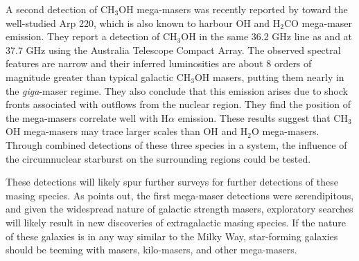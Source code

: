 A second detection of CH$_3$OH mega-masers was recently reported by \citet{chen_methanol_2015} toward the well-studied Arp 220, which is also known to harbour OH and H$_2$CO mega-maser emission. They report a detection of CH$_3$OH in the same 36.2 GHz line as \citet{wang2014_SiO_CH3OH} and at 37.7 GHz using the Australia Telescope Compact Array. The observed spectral features are narrow and their inferred luminosities are about 8 orders of magnitude greater than typical galactic CH$_3$OH masers, putting them nearly in the {\it giga}-maser regime. They also conclude that this emission arises due to shock fronts associated with outflows from the nuclear region. They find the position of the mega-masers correlate well with H$\alpha$ emission. These results suggest that CH$_3$OH mega-masers may trace larger scales than OH and H$_2$O mega-masers. Through combined detections of these three species in a system, the influence of the circumnuclear starburst on the surrounding regions could be tested.

These detections will likely spur further surveys for further detections of these masing species. As \citet{darling2012} points out, the first mega-maser detections were serendipitous, and given the widespread nature of galactic strength masers, exploratory searches will likely result in new discoveries of extragalactic masing species. If the nature of these galaxies is in any way similar to the Milky Way, star-forming galaxies should be teeming with masers, kilo-masers, and other mega-masers. 